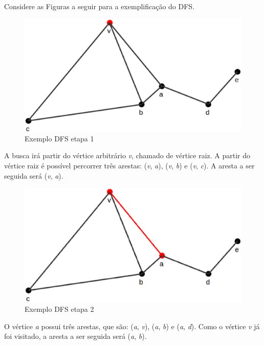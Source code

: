 \begin{apendicesenv}
Considere as Figuras a seguir para a exemplificação do DFS.

\begin{figure}[!h]
	\centering
	\includegraphics[scale=0.25]{figuras/capitulo2/dfs/dfs1.eps}
	\caption[Exemplo DFS etapa 1]{Exemplo DFS etapa 1 \cite{Cormen:2001}}
	\label{dfs1}
\end{figure}

A busca irá partir do vértice arbitrário \textit{v}, chamado de vértice raiz. A partir do vértice raiz é possível percorrer três arestas: (\textit{v}, \textit{a}), (\textit{v}, \textit{b}) e (\textit{v}, \textit{c}). A aresta a ser seguida será (\textit{v}, \textit{a}).

\begin{figure}[!h]
	\centering
	\includegraphics[scale=0.25]{figuras/capitulo2/dfs/dfs2.eps}
	\caption[Exemplo DFS etapa 2]{Exemplo DFS etapa 2 \cite{Cormen:2001}}
	\label{dfs2}
\end{figure}

O vértice \textit{a} possui três arestas, que são: (\textit{a}, \textit{v}), (\textit{a}, \textit{b}) e (\textit{a}, \textit{d}). Como o vértice \textit{v} já foi visitado, a aresta a ser seguida será (\textit{a}, \textit{b}).


\end{apendicesenv}
